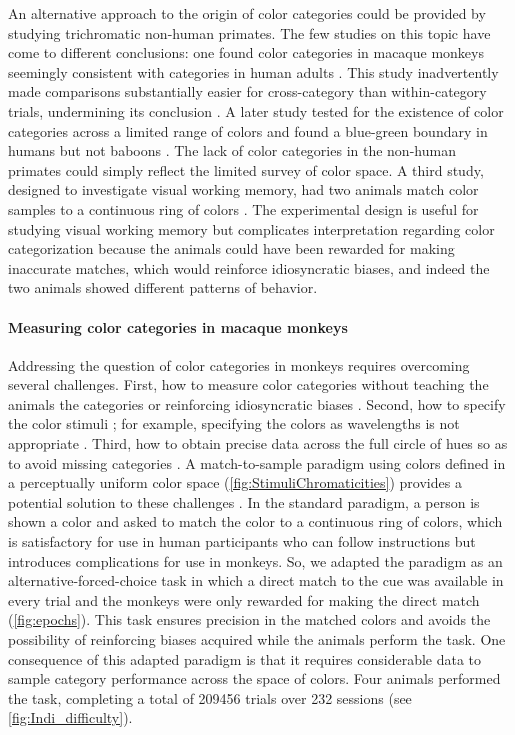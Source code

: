 An alternative approach to the origin of color categories could be provided by studying trichromatic non-human primates\citep{siuda-krzywicka_biological_2019}. 
The few studies on this topic have come to different conclusions: one found color categories in macaque monkeys seemingly consistent with categories in human adults \citep{sandell_color_1979}. 
This study inadvertently made comparisons substantially easier for cross-category than within-category trials, undermining its conclusion \citep{davidoff_cross-species_2010}. 
A later study tested for the existence of color categories across a limited range of colors and found a blue-green boundary in humans but not baboons \citep{fagot_cross-species_2006}.
The lack of color categories in the non-human primates could simply reflect the limited survey of color space. 
A third study, designed to investigate visual working memory, had two animals match color samples to a continuous ring of colors \citep{panichello_error-correcting_2019}. 
The experimental design is useful for studying visual working memory but complicates interpretation regarding color categorization because the animals could have been rewarded for making inaccurate matches, which would reinforce idiosyncratic biases, and indeed the two animals showed different patterns of behavior.

\paragraph{Measuring color categories in macaque monkeys}

Addressing the question of color categories in monkeys requires overcoming several challenges. 
First, how to measure color categories without teaching the animals the categories or reinforcing idiosyncratic biases \citep{essock_color_1977,matsuno_color_2004}.
Second, how to specify the color stimuli \citep{siuda-krzywicka_biological_2019}; for example, specifying the colors as wavelengths \citep{sandell_color_1979}
is not appropriate \citep{davidoff_cross-species_2010}. 
Third, how to obtain precise data across the full circle of hues so as to avoid missing categories \citep{fagot_cross-species_2006}.
A match-to-sample paradigm using colors defined in a perceptually uniform color space (\autoref{fig:StimuliChromaticities}) provides a potential solution to these challenges \citep{bae_why_2015}.
In the standard paradigm, a person is shown a color and asked to match the color to a continuous ring of colors, which is satisfactory for use in human participants who can follow instructions but introduces complications for use in monkeys.
So, we adapted the paradigm as an alternative-forced-choice task in which a direct match to the cue was available in every trial and the monkeys were only rewarded for making the direct match (\autoref{fig:epochs}). 
This task ensures precision in the matched colors and avoids the possibility of reinforcing biases acquired while the animals perform the task.
One consequence of this adapted paradigm is that it requires considerable data to sample category performance across the space of colors. 
Four animals performed the task, completing a total of 209456 trials over 232 sessions (see \autoref{fig:Indi_difficulty}).


